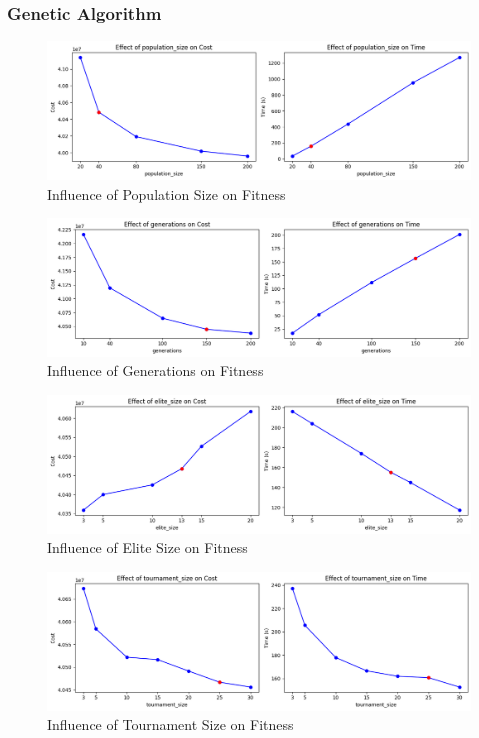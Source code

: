 \documentclass{article}
\begin{document}
\subsubsection{Genetic Algorithm}
\begin{figure}[H]
    \centering
    \includegraphics[width=\linewidth]{effect_of_population_size.png}
    \caption{Influence of Population Size on Fitness}
    \label{fig:pop_size}
\end{figure}

\begin{figure}[H]
    \centering
    \includegraphics[width=\linewidth]{effect_of_generations.png}
    \caption{Influence of Generations on Fitness}
    \label{fig:generations}
\end{figure}

\begin{figure}[H]
    \centering
    \includegraphics[width=\linewidth]{effect_of_elite_size.png}
    \caption{Influence of Elite Size on Fitness}
    \label{fig:elite_size}
\end{figure}

\begin{figure}[H]
    \centering
    \includegraphics[width=\linewidth]{effect_of_tournament_size.png}
    \caption{Influence of Tournament Size on Fitness}
    \label{fig:tournament_size}
\end{figure}
\end{document}
